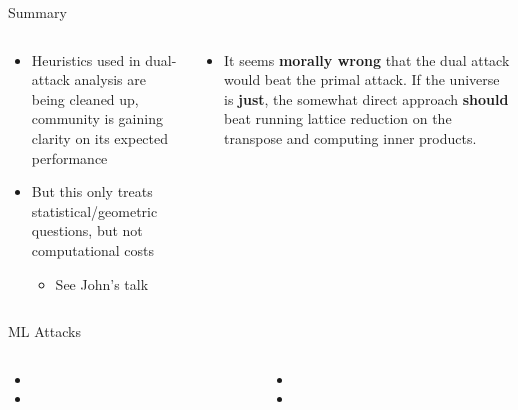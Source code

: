 \documentclass[xcolor=table,10pt,aspectratio=169]{beamer}
\begin{document}
\begin{frame}[label={sec:org33ddb80}]{Summary}
\begin{columns}[t]
\begin{column}{0.6\columnwidth}
\begin{itemize}
\item Heuristics used in dual-attack analysis are being cleaned up, community is gaining clarity on its expected performance
\item But this only treats statistical/geometric questions, but not computational costs
\begin{itemize}
\item See John's talk
\end{itemize}
\end{itemize}
\end{column}

\begin{column}{0.4\columnwidth}
\begin{itemize}
\item It seems \textbf{morally wrong} that the dual attack would beat the primal attack. If the universe is \textbf{just}, the somewhat direct approach \textbf{should} beat running lattice reduction on the transpose and computing inner products.
\end{itemize}
\end{column}
\end{columns}
\end{frame}

\begin{frame}[label={sec:orgd85b71f}]{ML Attacks}
\begin{columns}
\begin{column}[t]{0.5\columnwidth}
{\footnotesize

\begin{itemize}
\item {}
\item {}
\end{itemize}

\par}
\end{column}

\begin{column}[t]{0.5\columnwidth}
{\footnotesize

\begin{itemize}
\item {}
\item {}
\end{itemize}

\par}
\end{column}
\end{columns}
\end{frame}
\end{document}
